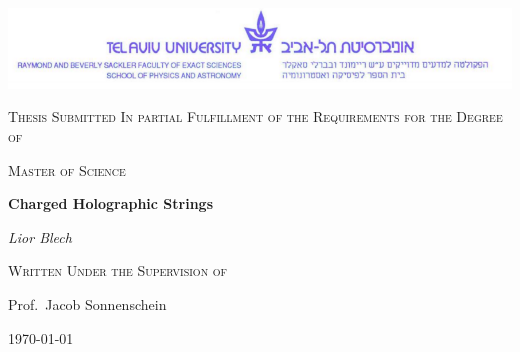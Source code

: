 \documentclass[11pt,a4paper]{article}
\begin{document}
\lstset{language=Mathematica} 


\flushbottom
\pagebreak
\begin{titlepage}
	\centering
	\includegraphics[scale=0.65]{figures/TAUlogo.png}\par\vspace{1cm}
	\vspace{1cm}
	{\scshape\Large Thesis Submitted In partial Fulfillment of the Requirements for the Degree of\par}
	\vspace{1cm}
	{\scshape\Large Master of Science\par}
	\vspace{1.5cm}
	{\huge\bfseries Charged Holographic Strings\par}
	\vspace{2cm}
	{\Large\itshape Lior Blech\par}
	\vfill
	{\scshape\Large Written Under the Supervision of\par
	Prof.~Jacob Sonnenschein}

	\vfill

	{\large \today\par}
\end{titlepage}
\begin{abstract}
We revisit the holographic description of hadrons, adding an electromagnetic interaction term and taking account of one loop corrections through a casimir energy term. We first review the theoretical background: AdS/CFT correspondence, confining gravitational backgrounds and the approximating model of the spinning string with endpoint masses, including the one loop quantum corrections. We then analyse the effect of adding the electromagnetic charges and the casimir energy. Finally we confront the results with PDG data by fitting to the Regge trajectories and attempt to further constrict the parameter space through the determination of the mass difference between the up and down quarks.
\end{abstract}
\end{document}
